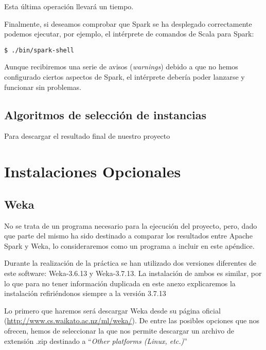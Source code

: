 Esta última operación llevará un tiempo. 

Finalmente, si deseamos comprobar que Spark se ha desplegado correctamente podemos ejecutar, por ejemplo, el intérprete de comandos de Scala para Spark:

\begin{lstlisting}
$ ./bin/spark-shell
\end{lstlisting}

Aunque recibiremos una serie de avisos (\textit{warnings}) debido a que no hemos configurado ciertos aspectos de Spark, el intérprete debería poder lanzarse y funcionar sin problemas.



\subsection{Algoritmos de selección de instancias}

Para descargar el resultado final de nuestro proyecto



\section{Instalaciones Opcionales}

\subsection{Weka}

No se trata de un programa necesario para la ejecución del proyecto, pero, dado que parte del mismo ha sido destinado a comparar los resultados entre Apache Spark y Weka, lo consideraremos como un programa a incluir en este apéndice.

Durante la realización de la práctica se han utilizado dos versiones diferentes de este software: Weka-3.6.13 y Weka-3.7.13. La instalación de ambos es similar, por lo que para no tener información duplicada en este anexo explicaremos la instalación refiriéndonos siempre a la versión 3.7.13

Lo primero que haremos será descargar Weka desde su página oficial (\url{http://www.cs.waikato.ac.nz/ml/weka/}). De entre las posibles opciones que nos ofrecen, hemos de seleccionar la que nos permite descargar un archivo de extensión .zip destinado a ``\textit{Other platforms (Linux, etc.)}''

